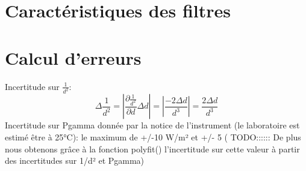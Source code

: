 \section{Caractéristiques des filtres}


\section{Calcul d'erreurs}


Incertitude sur \(\frac{1}{d^2}\): 
\begin{equation*} 
    \Delta \frac{1}{d^2} = \left|\frac{\partial\frac{1}{d^2}}{\partial d}\Delta d\right| = \left|\frac{-2\Delta d}{d^3}\right| = \frac{2\Delta d}{d^3} 
\end{equation*}
Incertitude sur Pgamma donnée par la notice de l'instrument (le laboratoire est estimé être à 25°C): le maximum de +/-10 W/m² et +/- 5%
(   TODO::::::    De plus nous obtenons grâce à la fonction polyfit() l'incertitude sur cette valeur à partir des incertitudes sur 1/d² et Pgamma)



